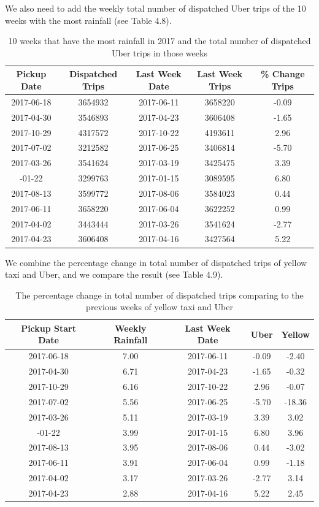 \documentclass[12pt,twoside]{reedthesis}
\theoremstyle{definition}
\theoremstyle{definition}
\theoremstyle{definition}
\theoremstyle{remark}
\begin{document}
We also need to add the weekly total number of dispatched Uber trips of
the 10 weeks with the most rainfall (see Table 4.8).
\begin{table}

\caption{\label{tab:unnamed-chunk-80}10 weeks that have the most rainfall in 2017 and the total number of dispatched Uber trips in those weeks}
\centering
\begin{tabular}[t]{ccccc}
\toprule
Pickup Date & Dispatched Trips & Last Week Date & Last Week Trips & \% Change Trips\\
\midrule
2017-06-18 & 3654932 & 2017-06-11 & 3658220 & -0.09\\
2017-04-30 & 3546893 & 2017-04-23 & 3606408 & -1.65\\
2017-10-29 & 4317572 & 2017-10-22 & 4193611 & 2.96\\
2017-07-02 & 3212582 & 2017-06-25 & 3406814 & -5.70\\
2017-03-26 & 3541624 & 2017-03-19 & 3425475 & 3.39\\
\addlinespace
2017-01-22 & 3299763 & 2017-01-15 & 3089595 & 6.80\\
2017-08-13 & 3599772 & 2017-08-06 & 3584023 & 0.44\\
2017-06-11 & 3658220 & 2017-06-04 & 3622252 & 0.99\\
2017-04-02 & 3443444 & 2017-03-26 & 3541624 & -2.77\\
2017-04-23 & 3606408 & 2017-04-16 & 3427564 & 5.22\\
\bottomrule
\end{tabular}
\end{table}
We combine the percentage change in total number of dispatched trips of
yellow taxi and Uber, and we compare the result (see Table 4.9).
\begin{table}

\caption{\label{tab:unnamed-chunk-82}The percentage change in total number of dispatched trips comparing to the previous weeks of yellow taxi and Uber}
\centering
\begin{tabular}[t]{ccccc}
\toprule
Pickup Start Date & Weekly Rainfall & Last Week Date & Uber & Yellow\\
\midrule
2017-06-18 & 7.00 & 2017-06-11 & -0.09 & -2.40\\
2017-04-30 & 6.71 & 2017-04-23 & -1.65 & -0.32\\
2017-10-29 & 6.16 & 2017-10-22 & 2.96 & -0.07\\
2017-07-02 & 5.56 & 2017-06-25 & -5.70 & -18.36\\
2017-03-26 & 5.11 & 2017-03-19 & 3.39 & 3.02\\
\addlinespace
2017-01-22 & 3.99 & 2017-01-15 & 6.80 & 3.96\\
2017-08-13 & 3.95 & 2017-08-06 & 0.44 & -3.02\\
2017-06-11 & 3.91 & 2017-06-04 & 0.99 & -1.18\\
2017-04-02 & 3.17 & 2017-03-26 & -2.77 & 3.14\\
2017-04-23 & 2.88 & 2017-04-16 & 5.22 & 2.45\\
\bottomrule
\end{tabular}
\end{table}
\end{document}
